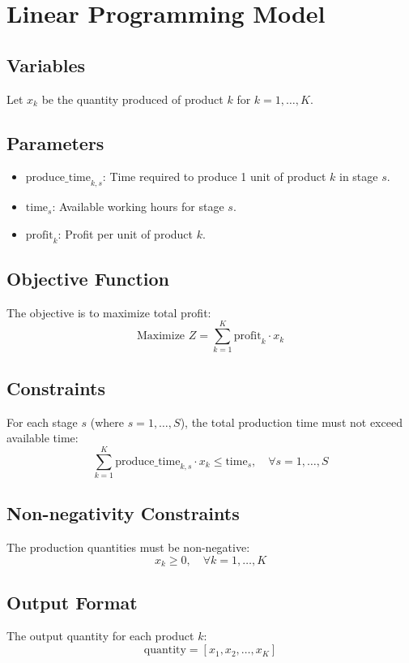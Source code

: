 \documentclass{article}
\begin{document}
\section*{Linear Programming Model}

\subsection*{Variables}
Let \( x_k \) be the quantity produced of product \( k \) for \( k = 1, \ldots, K \).

\subsection*{Parameters}
\begin{itemize}
    \item \( \text{produce\_time}_{k,s} \): Time required to produce 1 unit of product \( k \) in stage \( s \).
    \item \( \text{time}_s \): Available working hours for stage \( s \).
    \item \( \text{profit}_k \): Profit per unit of product \( k \).
\end{itemize}

\subsection*{Objective Function}
The objective is to maximize total profit:
\[
\text{Maximize } Z = \sum_{k=1}^{K} \text{profit}_k \cdot x_k
\]

\subsection*{Constraints}
For each stage \( s \) (where \( s = 1, \ldots, S \)), the total production time must not exceed available time:
\[
\sum_{k=1}^{K} \text{produce\_time}_{k,s} \cdot x_k \leq \text{time}_s, \quad \forall s = 1, \ldots, S
\]

\subsection*{Non-negativity Constraints}
The production quantities must be non-negative:
\[
x_k \geq 0, \quad \forall k = 1, \ldots, K
\]

\subsection*{Output Format}
The output quantity for each product \( k \):
\[
\text{quantity} = [x_1, x_2, \ldots, x_K]
\]
\end{document}
